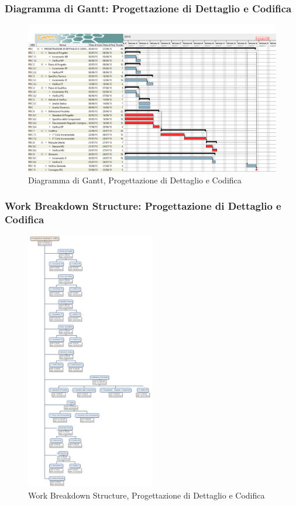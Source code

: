 \subsubsection{Diagramma di Gantt: Progettazione di Dettaglio e Codifica}
\begin{figure}[h] 
	\centering
	\includegraphics[width=\textwidth]{./img/progettazione_dettaglio.png}
	\caption{Diagramma di Gantt, Progettazione di Dettaglio e Codifica}
	\label{fig4}
\end{figure}

\newpage
\subsubsection{Work Breakdown Structure: Progettazione di Dettaglio e Codifica}
\begin{figure}[h]
	\centering
	\includegraphics[width=0.5\textwidth]{./img/wbs_progettazione_dettaglio_codifica.png}
	\caption{Work Breakdown Structure, Progettazione di Dettaglio e Codifica}
\end{figure}

